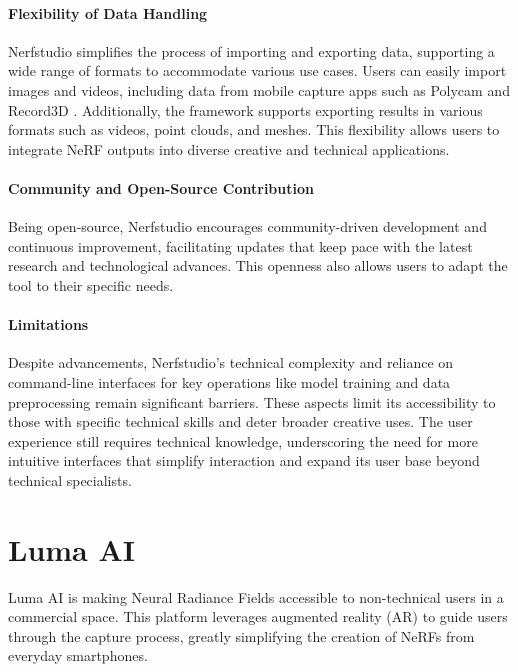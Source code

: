 \paragraph{Flexibility of Data Handling}
Nerfstudio simplifies the process of importing and exporting data, supporting a wide range of formats to accommodate various use cases.
Users can easily import images and videos, including data from mobile capture apps such as Polycam \cite{noauthor_polycam_nodate} and Record3D \cite{noauthor_record3d_nodate}.
Additionally, the framework supports exporting results in various formats such as videos, point clouds, and meshes.
This flexibility allows users to integrate NeRF outputs into diverse creative and technical applications.

\paragraph{Community and Open-Source Contribution}
Being open-source, Nerfstudio encourages community-driven development and continuous improvement, facilitating updates that keep pace with the latest research and technological advances.
This openness also allows users to adapt the tool to their specific needs.

\paragraph{Limitations}

Despite advancements, Nerfstudio's technical complexity and reliance on command-line interfaces for key operations like model training and data preprocessing remain significant barriers.
These aspects limit its accessibility to those with specific technical skills and deter broader creative uses.
The user experience still requires technical knowledge, underscoring the need for more intuitive interfaces that simplify interaction and expand its user base beyond technical specialists.

\section{Luma AI}
\label{sec:related:luma}

Luma AI \cite{ai_luma_nodate} is making Neural Radiance Fields accessible to non-technical users in a commercial space.
This platform leverages augmented reality (AR) to guide users through the capture process, greatly simplifying the creation of NeRFs from everyday smartphones.

